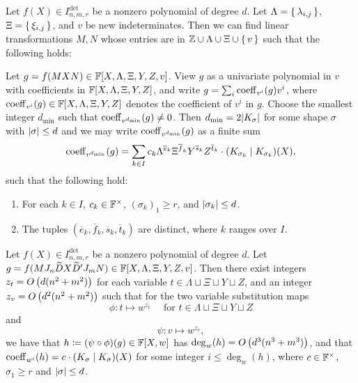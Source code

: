 \documentclass[letterpaper, 11pt]{amsart}
\newif\iffull
\begin{document}
\begin{lem}\label{lem:key}
  Let $f(X) \in I^{\det}_{n, m, r}$ be a nonzero polynomial of degree $d$.
  Let $\Lambda = \set{\lambda_{i, j}}$, $\Xi = \set{\xi_{i, j}}$, and $v$ be new indeterminates.
  Then we can find linear transformations $M, N$ whose entries are in $\mathbb{Z} \cup \Lambda \cup \Xi \cup \set{v}$ such that the following holds:

  Let $g = f(M X N) \in \mathbb{F}[X, \Lambda, \Xi, Y, Z, v]$.
  View $g$ as a univariate polynomial in $v$ with coefficients in $\mathbb{F}[X,\Lambda,\Xi,Y,Z]$, and write $g=\sum_{i} \operatorname{coeff}_{v^i}(g) v^i$, where $\operatorname{coeff}_{v^i}(g)\in \mathbb{F}[X,\Lambda,\Xi,Y,Z]$ denotes the coefficient of $v^i$ in $g$.
  Choose the smallest integer $d_{\min}$ such that  $\operatorname{coeff}_{v^{d_{\min}}}(g)\neq 0$.
  Then $d_{\min}=2 \abs{K_\sigma}$ for some shape $\sigma$ with $\abs{\sigma} \leq d$ and we may write $\operatorname{coeff}_{v^{d_{\min}}}(g)$ as a finite sum
  \begin{equation}\label{eq:required}
    \operatorname{coeff}_{v^{d_{\min}}}(g)=\sum_{k\in I} c_k \Lambda^{\overline{e}_k}\Xi^{\overline{f}_k}Y^{\overline{s}_k}Z^{\overline{t}_k}\cdot (K_{\sigma_k}\mid K_{\sigma_k})(X),
  \end{equation}
  such that the following hold:
  \begin{enumerate}
    \item\label{item:required1} For each $k\in I$, $c_k\in\mathbb{F}^\times$,  $(\sigma_k)_1\geq r$, and $\abs{\sigma_k} \leq d$.
    \item\label{item:required2} The tuples $(\overline{e}_k,\overline{f}_k, \overline{s}_k,\overline{t}_k)$ are distinct, where $k$ ranges over $I$.
  \end{enumerate}
\end{lem}
\fi

\iffull
\Cref{lem:key} helps us separate a collection of terms solely containing canonical bideterminants.
The next lemma further applies the isolation lemma to single out one term from this collection.

\iffull
\clearpage
\fi

\begin{lem}\label{lem:univariate}
  Let $f(X) \in I^{\det}_{n, m, r}$
  be a nonzero polynomial of degree $d$.
  Let $g=f(M J_n \widetilde{D} X \widetilde{D}' J_m N) \in \mathbb{F}[X, \Lambda, \Xi, Y, Z, v]$.
  Then there exist integers $z_t = O\kern-0.0pt\left(d(n^2+m^2)\right)$ for each variable $t\in \Lambda\sqcup\Xi\sqcup Y\sqcup Z$, and an integer $z_v = O\kern-0.0pt\left(d^2(n^2+m^2)\right)$ such that for the two variable substitution maps
  \[
    \phi\colon t \mapsto w^{z_t} \quad \text{ for } t\in \Lambda \sqcup \Xi \sqcup Y \sqcup Z
  \]
  and
  \[
    \psi\colon v \mapsto w^{z_v},
  \]
  we have that $h \coloneqq (\psi\circ\phi)(g)\in\mathbb{F}[X,w]$ has $\deg_w(h) = O\kern-0.0pt\left(d^3(n^3+m^3)\right)$, and that $\operatorname{coeff}_{w^i}(h) = c\cdot (K_\sigma\mid K_\sigma)(X)$ for some integer $i\leq \deg_w(h)$, where $c\in\mathbb{F}^\times$, $\sigma_1\geq r$ and $\abs{\sigma} \leq d$.
\end{lem}
\end{document}
